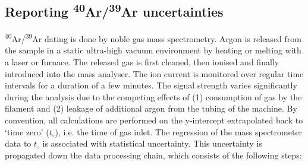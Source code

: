\documentclass{article}
\begin{document}
\setcounter{section}{3}
\setcounter{subsection}{1}
\subsection{Reporting \textsuperscript{40}Ar/\textsuperscript{39}Ar uncertainties}
\label{sec:reportinguncertainties}

\textsuperscript{40}Ar/\textsuperscript{39}Ar dating is done by noble
gas mass spectrometry.  Argon is released from the sample in a static
ultra-high vacuum environment by heating or melting with a laser or
furnace. The released gas is first cleaned, then ionised and finally
introduced into the mass analyser.  The ion current is monitored over
regular time intervals for a duration of a few minutes. The signal
strength varies significantly during the analysis due to the competing
effects of (1) consumption of gas by the filament and (2) leakage of
additional argon from the tubing of the machine.  By convention, all
calculations are performed on the y-intercept extrapolated back to
`time zero' ($t_\circ$), i.e. the time of gas inlet. The regression of
the mass spectrometer data to $t_\circ$ is associated with statistical
uncertainty. This uncertainty is propagated down the data processing
chain, which consists of the following steps:
\end{document}
